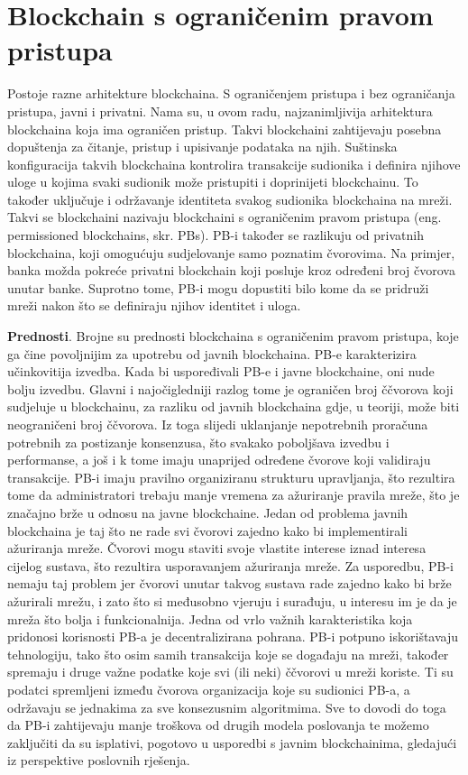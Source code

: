 \documentclass[times, utf8, diplomski]{fer}
\begin{document}
\chapter{Blockchain s ograničenim pravom pristupa}
Postoje razne arhitekture blockchaina. S ograničenjem pristupa i bez ograničanja pristupa, javni i privatni. Nama su, u ovom radu, najzanimljivija arhitektura blockchaina koja ima ograničen pristup. Takvi blockchaini zahtijevaju posebna dopuštenja za čitanje, pristup i upisivanje podataka na njih. Suštinska konfiguracija takvih blockchaina kontrolira transakcije sudionika i definira njihove uloge u kojima svaki sudionik može pristupiti i doprinijeti blockchainu. To također uključuje i održavanje identiteta svakog sudionika blockchaina na mreži. Takvi se blockchaini nazivaju blockchaini s ograničenim pravom pristupa (eng. permissioned blockchains, skr. PBs). PB-i također se razlikuju od privatnih blockchaina, koji omogućuju sudjelovanje samo poznatim čvorovima. Na primjer, banka možda pokreće privatni blockchain koji posluje kroz određeni broj čvorova unutar banke. Suprotno tome, PB-i mogu dopustiti bilo kome da se pridruži mreži nakon što se definiraju njihov identitet i uloga.

\textbf{Prednosti}. Brojne su prednosti blockchaina s ograničenim pravom pristupa, koje ga čine povoljnijim za upotrebu od javnih blockchaina. PB-e karakterizira učinkovitija izvedba. Kada bi uspoređivali PB-e i javne blockchaine, oni nude bolju izvedbu. Glavni i najočigledniji razlog tome je ograničen broj ččvorova koji sudjeluje u blockchainu, za razliku od javnih blockchaina gdje, u teoriji, može biti neograničeni broj ččvorova. Iz toga slijedi uklanjanje nepotrebnih proračuna potrebnih za postizanje konsenzusa, što svakako poboljšava izvedbu i performanse, a još i k tome imaju unaprijed određene čvorove koji validiraju transakcije. PB-i imaju pravilno organiziranu strukturu upravljanja, što rezultira tome da administratori trebaju manje vremena za ažuriranje pravila mreže, što je značajno brže u odnosu na javne blockchaine. Jedan od problema javnih blockchaina je taj što ne rade svi čvorovi zajedno kako bi implementirali ažuriranja mreže. Čvorovi mogu staviti svoje vlastite interese iznad interesa cijelog sustava, što rezultira usporavanjem ažuriranja mreže. Za usporedbu, PB-i nemaju taj problem jer čvorovi unutar takvog sustava rade zajedno kako bi brže ažurirali mrežu, i zato što si međusobno vjeruju i surađuju, u interesu im je da je mreža što bolja i funkcionalnija. Jedna od vrlo važnih karakteristika koja pridonosi korisnosti PB-a je decentralizirana pohrana. PB-i potpuno iskorištavaju tehnologiju, tako što osim samih transakcija koje se događaju na mreži, također spremaju i druge važne podatke koje svi (ili neki) ččvorovi u mreži koriste. Ti su podatci spremljeni između čvorova organizacija koje su sudionici PB-a, a održavaju se jednakima za sve konsezusnim algoritmima. Sve to dovodi do toga da PB-i zahtijevaju manje troškova od drugih modela poslovanja te možemo zaključiti da su isplativi, pogotovo u usporedbi s javnim blockchainima, gledajući iz perspektive poslovnih rješenja.
\end{document}
